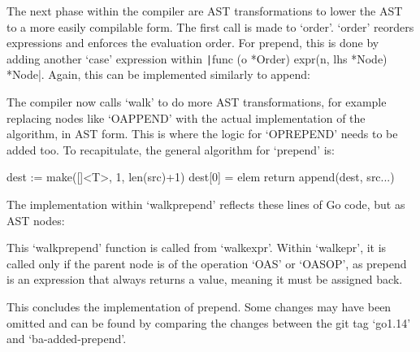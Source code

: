 \begin{code}
\end{code}

The next phase within the compiler are AST transformations to
lower the AST to a more easily compilable form. The first call
is made to `order'. `order' reorders expressions and enforces the
evaluation order. For prepend, this is done by adding another `case'
expression within \texttt|func (o *Order) expr(n, lhs *Node) *Node|.
Again, this can be implemented similarly to append:

\begin{code}
\end{code}

The compiler now calls `walk' to do more AST transformations, for example replacing
nodes like `OAPPEND' with the actual implementation of the algorithm, in AST form.
This is where the logic for `OPREPEND' needs to be added too.
To recapitulate, the general algorithm for `prepend' is:
\begin{gocode}
dest := make([]<T>, 1, len(src)+1)
dest[0] = elem
return append(dest, src...)
\end{gocode}

The implementation within `walkprepend' reflects these lines of Go code, but
as AST nodes:

\begin{code}
\end{code}

This `walkprepend' function is called from `walkexpr'. Within `walkepr', it is called
only if the parent node is of the operation `OAS' or `OASOP', as prepend is an expression that always
returns a value, meaning it must be assigned back.

This concludes the implementation of prepend. Some changes may have been omitted
and can be found by comparing the
changes between the git tag `go1.14'\cite{ba-go-1-14} and `ba-added-prepend'\cite{ba-added-prepend}.
